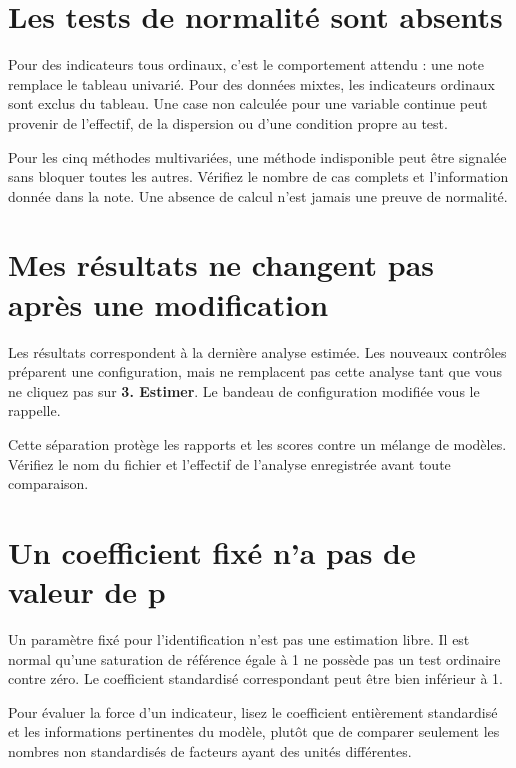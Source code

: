 \documentclass[
  french,
  11pt,
  a4paper,
  DIV=11,
  numbers=noendperiod]{scrreprt}
\begin{document}
\section{Les tests de normalité sont
absents}\label{les-tests-de-normalituxe9-sont-absents}

Pour des indicateurs tous ordinaux, c'est le comportement attendu : une
note remplace le tableau univarié. Pour des données mixtes, les
indicateurs ordinaux sont exclus du tableau. Une case non calculée pour
une variable continue peut provenir de l'effectif, de la dispersion ou
d'une condition propre au test.

Pour les cinq méthodes multivariées, une méthode indisponible peut être
signalée sans bloquer toutes les autres. Vérifiez le nombre de cas
complets et l'information donnée dans la note. Une absence de calcul
n'est jamais une preuve de normalité.

\section{Mes résultats ne changent pas après une
modification}\label{mes-ruxe9sultats-ne-changent-pas-apruxe8s-une-modification}

Les résultats correspondent à la dernière analyse estimée. Les nouveaux
contrôles préparent une configuration, mais ne remplacent pas cette
analyse tant que vous ne cliquez pas sur \textbf{3. Estimer}. Le bandeau
de configuration modifiée vous le rappelle.

Cette séparation protège les rapports et les scores contre un mélange de
modèles. Vérifiez le nom du fichier et l'effectif de l'analyse
enregistrée avant toute comparaison.

\section{Un coefficient fixé n'a pas de valeur de
p}\label{un-coefficient-fixuxe9-na-pas-de-valeur-de-p}

Un paramètre fixé pour l'identification n'est pas une estimation libre.
Il est normal qu'une saturation de référence égale à 1 ne possède pas un
test ordinaire contre zéro. Le coefficient standardisé correspondant
peut être bien inférieur à 1.

Pour évaluer la force d'un indicateur, lisez le coefficient entièrement
standardisé et les informations pertinentes du modèle, plutôt que de
comparer seulement les nombres non standardisés de facteurs ayant des
unités différentes.
\end{document}
